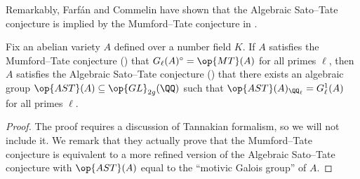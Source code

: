 \documentclass[../thesis.tex]{subfiles}
\begin{document}
Remarkably, Farf\'an and Commelin have shown that the Algebraic Sato--Tate conjecture is implied by the Mumford--Tate conjecture in \cite{farfan-commelin-mtc-astc}.
\begin{theorem} \label{thm:mtc-implies-astc}
	Fix an abelian variety $A$ defined over a number field $K$. If $A$ satisfies the Mumford--Tate conjecture () that $G_\ell(A)^\circ=\op{MT}(A)$ for all primes $\ell$, then $A$ satisfies the Algebraic Sato--Tate conjecture () that there exists an algebraic group $\op{AST}(A)\subseteq\op{GL}_{2g}(\QQ)$ such that $\op{AST}(A)_{\QQ_\ell}=G_\ell^1(A)$ for all primes $\ell$.
\end{theorem}
\begin{proof}
	The proof requires a discussion of Tannakian formalism, so we will not include it. We remark that they actually prove that the Mumford--Tate conjecture is equivalent to a more refined version of the Algebraic Sato--Tate conjecture with $\op{AST}(A)$ equal to the ``motivic Galois group'' of $A$.
\end{proof}

\end{document}
